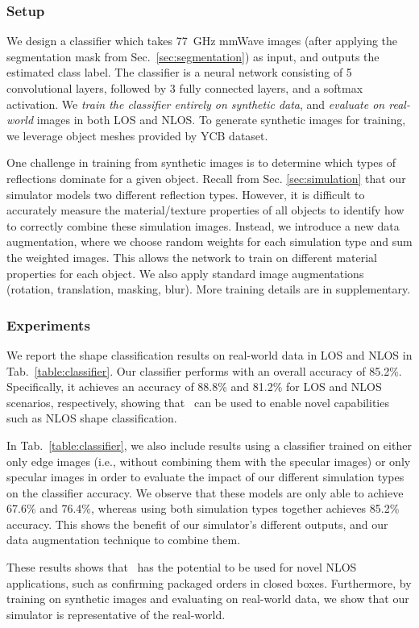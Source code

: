 \subsubsection{Setup}

We design a classifier which takes 77~GHz mmWave images (after applying the segmentation mask from Sec.~\ref{sec:segmentation}) as input, and outputs the estimated class label. The classifier is a neural network consisting of 5 convolutional layers, followed by 3 fully connected layers, and a softmax activation. We \textit{train the classifier entirely on synthetic data}, and \textit{evaluate on real-world} images in both LOS and NLOS. To generate synthetic images for training, we leverage object meshes provided by YCB dataset.

One challenge in training from synthetic images is to determine which types of reflections dominate for a given object. Recall from Sec. \ref{sec:simulation} that our simulator models two different reflection types. However, it is difficult to accurately measure the material/texture properties of all objects to identify how to correctly combine these simulation images. Instead, we introduce a new data augmentation, where we choose random weights for each simulation type and sum the weighted images. This allows the network to train on different material properties for each object. We also apply standard image augmentations (rotation, translation, masking, blur). More training details are in supplementary.

\vspace{-0.1pt}
\subsubsection{Experiments}


We report the shape classification results on real-world data in LOS and NLOS in Tab.~\ref{table:classifier}. Our classifier performs with an overall accuracy of 85.2\%. Specifically, it achieves an accuracy of 88.8\% and 81.2\% for LOS and NLOS scenarios, respectively, showing that \name\ can be used to enable novel capabilities such as NLOS shape classification.

In Tab.~\ref{table:classifier}, we also include results using a classifier trained on either only edge images (i.e., without combining them with the specular images) or only specular images in order to evaluate the impact of our different simulation types on the classifier accuracy. We observe that these models are only able to achieve 67.6\% and 76.4\%, whereas using both simulation types together achieves 85.2\% accuracy. This shows the benefit of our simulator's different outputs, and our data augmentation technique to combine them.

These results shows that \name\ has the potential to be used for novel NLOS applications, such as confirming packaged orders in closed boxes. Furthermore, by training on synthetic images and evaluating on real-world data, we show that our simulator is representative of the real-world. 


